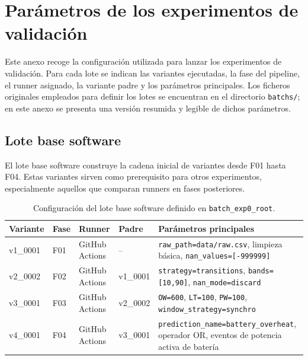 \appendix

\section{Parámetros de los experimentos de validación}
\label{anexo:parametros-experimentos}

Este anexo recoge la configuración utilizada para lanzar los experimentos de validación. Para cada lote se indican las variantes ejecutadas, la fase del pipeline, el runner asignado, la variante padre y los parámetros principales. Los ficheros originales empleados para definir los lotes se encuentran en el directorio \texttt{batchs/}; en este anexo se presenta una versión resumida y legible de dichos parámetros.

\subsection{Lote base software}
\label{anexo:batch-exp0-root}

El lote base software construye la cadena inicial de variantes desde F01 hasta F04. Estas variantes sirven como prerequisito para otros experimentos, especialmente aquellos que comparan runners en fases posteriores.

\begin{table}[htbp]
    \centering
    \caption{Configuración del lote base software definido en \texttt{batch\_exp0\_root}.}
    \label{tab:params-batch-exp0-root}
    \begin{tabular}{p{}p{}p{}p{}p{}}
        \hline
        \textbf{Variante} & \textbf{Fase} & \textbf{Runner} & \textbf{Padre} & \textbf{Parámetros principales} \\
        \hline
        v1\_0001 & F01 & GitHub Actions & -- & \texttt{raw\_path=data/raw.csv}, limpieza básica, \texttt{nan\_values=[-999999]} \\
        v2\_0002 & F02 & GitHub Actions & v1\_0001 & \texttt{strategy=transitions}, \texttt{bands=[10,90]}, \texttt{nan\_mode=discard} \\
        v3\_0001 & F03 & GitHub Actions & v2\_0002 & \texttt{OW=600}, \texttt{LT=100}, \texttt{PW=100}, \texttt{window\_strategy=synchro} \\
        v4\_0001 & F04 & GitHub Actions & v3\_0001 & \texttt{prediction\_name=battery\_overheat}, operador OR, eventos de potencia activa de batería \\
        \hline
    \end{tabular}
\end{table}

